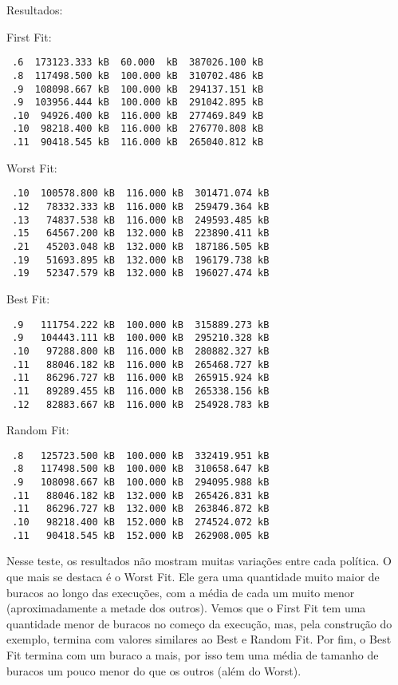 \documentclass{amsart}
\theoremstyle{plain}
\begin{document}
Resultados:

First Fit:
\begin{verbatim}
 .6  173123.333 kB  60.000  kB  387026.100 kB
 .8  117498.500 kB  100.000 kB  310702.486 kB
 .9  108098.667 kB  100.000 kB  294137.151 kB
 .9  103956.444 kB  100.000 kB  291042.895 kB
 .10  94926.400 kB  116.000 kB  277469.849 kB
 .10  98218.400 kB  116.000 kB  276770.808 kB
 .11  90418.545 kB  116.000 kB  265040.812 kB
\end{verbatim}

Worst Fit:
\begin{verbatim}
 .10  100578.800 kB  116.000 kB  301471.074 kB
 .12   78332.333 kB  116.000 kB  259479.364 kB
 .13   74837.538 kB  116.000 kB  249593.485 kB
 .15   64567.200 kB  132.000 kB  223890.411 kB
 .21   45203.048 kB  132.000 kB  187186.505 kB
 .19   51693.895 kB  132.000 kB  196179.738 kB
 .19   52347.579 kB  132.000 kB  196027.474 kB
\end{verbatim}

Best Fit:
\begin{verbatim}
 .9   111754.222 kB  100.000 kB  315889.273 kB
 .9   104443.111 kB  100.000 kB  295210.328 kB
 .10   97288.800 kB  116.000 kB  280882.327 kB
 .11   88046.182 kB  116.000 kB  265468.727 kB
 .11   86296.727 kB  116.000 kB  265915.924 kB
 .11   89289.455 kB  116.000 kB  265338.156 kB
 .12   82883.667 kB  116.000 kB  254928.783 kB
\end{verbatim}

Random Fit:
\begin{verbatim}
 .8   125723.500 kB  100.000 kB  332419.951 kB
 .8   117498.500 kB  100.000 kB  310658.647 kB
 .9   108098.667 kB  100.000 kB  294095.988 kB
 .11   88046.182 kB  132.000 kB  265426.831 kB
 .11   86296.727 kB  132.000 kB  263846.872 kB
 .10   98218.400 kB  152.000 kB  274524.072 kB
 .11   90418.545 kB  152.000 kB  262908.005 kB
\end{verbatim}


Nesse teste, os resultados não mostram muitas variações entre cada política. O que mais se destaca é o Worst Fit. Ele gera uma quantidade muito maior de buracos ao longo das execuções, com a média de cada um muito menor (aproximadamente a metade dos outros). Vemos que o First Fit tem uma quantidade menor de buracos no começo da execução, mas, pela construção do exemplo, termina com valores similares ao Best e Random Fit. Por fim, o Best Fit termina com um buraco a mais, por isso tem uma média de tamanho de buracos um pouco menor do que os outros (além do Worst).
\end{document}
